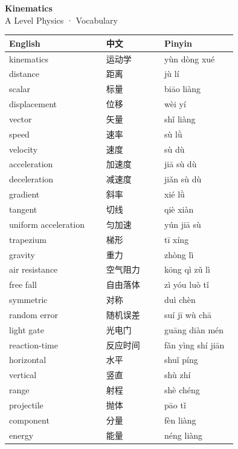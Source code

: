 \documentclass[11pt]{article}
\begin{document}
\begin{center}
  {\LARGE\bfseries Kinematics}\\[0.35em]
  {\large A Level Physics · Vocabulary}
\end{center}
\vspace{0.6em}

\begin{longtable}{@{}p{0.40\linewidth}p{0.24\linewidth}p{0.30\linewidth}@{}}
\toprule
\textbf{English} & \textbf{中文} & \textbf{Pinyin} \\
\midrule
\endhead
\bottomrule
\endlastfoot
kinematics & 运动学 & yùn dòng xué \\
distance & 距离 & jù lí \\
scalar & 标量 & biāo liàng \\
displacement & 位移 & wèi yí \\
vector & 矢量 & shǐ liàng \\
speed & 速率 & sù lǜ \\
velocity & 速度 & sù dù \\
acceleration & 加速度 & jiā sù dù \\
deceleration & 减速度 & jiǎn sù dù \\
gradient & 斜率 & xié lǜ \\
tangent & 切线 & qiè xiàn \\
uniform acceleration & 匀加速 & yún jiā sù \\
trapezium & 梯形 & tī xíng \\
gravity & 重力 & zhòng lì \\
air resistance & 空气阻力 & kōng qì zǔ lì \\
free fall & 自由落体 & zì yóu luò tǐ \\
symmetric & 对称 & duì chèn \\
random error & 随机误差 & suí jī wù chā \\
light gate & 光电门 & guāng diàn mén \\
reaction-time & 反应时间 & fǎn yìng shí jiān \\
horizontal & 水平 & shuǐ píng \\
vertical & 竖直 & shù zhí \\
range & 射程 & shè chéng \\
projectile & 抛体 & pāo tǐ \\
component & 分量 & fèn liàng \\
energy & 能量 & néng liàng \\
\end{longtable}
\end{document}
